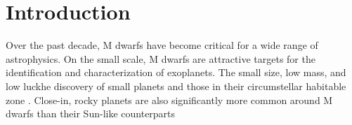 \documentclass[twocolumn]{aastex62}
\begin{document}
\NewPageAfterKeywords




\section{Introduction}\label{sec:intro}
Over the past decade, M dwarfs have become critical for a wide range of astrophysics. On the small scale, M dwarfs are attractive targets for the identification and characterization of exoplanets. The small size, low mass, and low luckhe discovery of small planets \citep[e.g.][]{Muirhead2012,Martinez:2017aa,Mann:2018} and those in their circumstellar habitable zone \citep[e.g.,][]{Tarter2007,Shields:2016aa,2017Natur.544..333D}. Close-in, rocky planets are also significantly more common around M dwarfs than their Sun-like counterparts \citep{Dressing2013,2013PNAS..11019273P,Mulders2015,Gaidos2016b}
\end{document}
